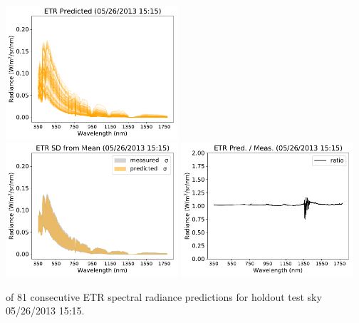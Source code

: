 \begin{center}
\includegraphics[width=0.48\textwidth]{img/05261515_predicted.pdf}\\
\vspace{0.2in}%
\includegraphics[width=0.48\textwidth]{img/05261515_std.pdf}
\includegraphics[width=0.48\textwidth]{img/05261515_ratio.pdf}
\end{center}

\clearpage
 of 81 consecutive ETR spectral radiance predictions for holdout test sky {05/26/2013 15:15}.\\%

